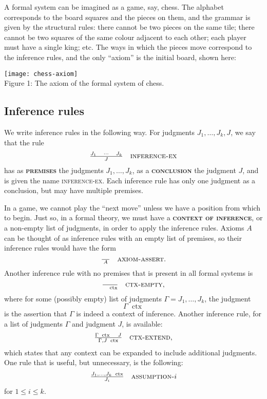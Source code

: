 \documentclass{article}
\newcommand{\defn}[1]{{\scshape\bfseries\color{MPBemph}#1}}
\newcommand{\infrule}[3]{\genfrac{}{}{}{}{#1}{#2}\hspace{1em}{\textsc{#3}}}
\DeclareMathOperator{\ctx}{~ctx}
\newcommand{\1}{\textbf{1}}
\newcommand{\0}{\mathbf{0}}
\newcommand{\2}{\textbf{2}}
\begin{document}
A formal system can be imagined as a game, say, chess. The alphabet corresponds to the board squares and the pieces on them, and the grammar is given by the structural rules: there cannot be two pieces on the same tile; there cannot be two squares of the same colour adjacent to each other; each player must have a single king; etc. The ways in which the pieces move correspond to the inference rules, and the only ``axiom'' is the initial board, shown here:
\begin{center}
	\texttt{[image: chess-axiom]} \\[3pt]
	Figure 1: The axiom of the formal system of chess.
\end{center}
\subsection{Inference rules}
We write inference rules in the following way. For judgments \( J_{1}, \dotsc, J_{k}, J \), we say that the rule
\[ \OD \infrule{J_{1} \hspace{1em} \cdots \hspace{1em} J_{k}}{J}{inference-ex} \]
has as \defn{premises} the judgments \( J_{1}, \dotsc, J_{k} \), as a \defn{conclusion} the judgment \( J \), and is given the name \textsc{inference-ex}. Each inference rule has only one judgment as a conclusion, but may have multiple premises.

In a game, we cannot play the ``next move'' unless we have a position from which to begin. Just so, in a formal theory, we must have a \defn{context of inference}, or a non-empty list of judgments, in order to apply the inference rules. Axioms \( A \) can be thought of as inference rules with an empty list of premises, so their inference rules would have the form
\[ \OD \infrule{}{\;A\;}{axiom-assert}. \]
Another inference rule with no premises that is present in all formal systems is
\[ \OD \infrule{}{\hspace{1.5ex} \ctx}{ctx-empty}, \]
where for some (possibly empty) list of judgments \( \Gamma = J_{1}, \dotsc, J_{k} \), the judgment
\[ \Gamma \ctx \]
is the assertion that \( \Gamma \) is indeed a context of inference. Another inference rule, for a list of judgments \( \Gamma \) and judgment \( J \), is available:
\[ \OD \infrule{\Gamma \ctx \hspace{1em} J}{\Gamma, J \ctx}{ctx-extend}, \]
which states that any context can be expanded to include additional judgments. One rule that is useful, but unnecessary, is the following:
\[ \OD \infrule{J_{1}, \dotsc, J_{k} \ctx}{J_{i}}{assumption-\( i \)} \]
for \( 1 \leq i \leq k \).
\end{document}
